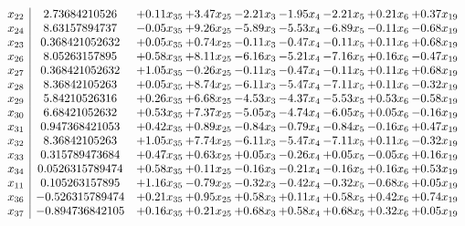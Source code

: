 \documentclass[8pt]{article}
\begin{document}
\[\begin{array}{c| c c@{\hskip 2pt} c@{\hskip 2pt} c@{\hskip 2pt} c@{\hskip 2pt} c@{\hskip 2pt} c@{\hskip 2pt} c@{\hskip 2pt} }
 x_{22}   &  2.73684210526 & +  0.11 x_{35} & +  3.47 x_{25} & -2.21 x_{3} & -1.95 x_{4} & -2.21 x_{5} & +  0.21 x_{6} & +  0.37 x_{19}\\
 x_{24}   &  8.63157894737 & -0.05 x_{35} & +  9.26 x_{25} & -5.89 x_{3} & -5.53 x_{4} & -6.89 x_{5} & -0.11 x_{6} & -0.68 x_{19}\\
 x_{23}   &  0.368421052632 & +  0.05 x_{35} & +  0.74 x_{25} & -0.11 x_{3} & -0.47 x_{4} & -0.11 x_{5} & +  0.11 x_{6} & +  0.68 x_{19}\\
 x_{26}   &  8.05263157895 & +  0.58 x_{35} & +  8.11 x_{25} & -6.16 x_{3} & -5.21 x_{4} & -7.16 x_{5} & +  0.16 x_{6} & -0.47 x_{19}\\
 x_{27}   &  0.368421052632 & +  1.05 x_{35} & -0.26 x_{25} & -0.11 x_{3} & -0.47 x_{4} & -0.11 x_{5} & +  0.11 x_{6} & +  0.68 x_{19}\\
 x_{28}   &  8.36842105263 & +  0.05 x_{35} & +  8.74 x_{25} & -6.11 x_{3} & -5.47 x_{4} & -7.11 x_{5} & +  0.11 x_{6} & -0.32 x_{19}\\
 x_{29}   &  5.84210526316 & +  0.26 x_{35} & +  6.68 x_{25} & -4.53 x_{3} & -4.37 x_{4} & -5.53 x_{5} & +  0.53 x_{6} & -0.58 x_{19}\\
 x_{30}   &  6.68421052632 & +  0.53 x_{35} & +  7.37 x_{25} & -5.05 x_{3} & -4.74 x_{4} & -6.05 x_{5} & +  0.05 x_{6} & -0.16 x_{19}\\
 x_{31}   &  0.947368421053 & +  0.42 x_{35} & +  0.89 x_{25} & -0.84 x_{3} & -0.79 x_{4} & -0.84 x_{5} & -0.16 x_{6} & +  0.47 x_{19}\\
 x_{32}   &  8.36842105263 & +  1.05 x_{35} & +  7.74 x_{25} & -6.11 x_{3} & -5.47 x_{4} & -7.11 x_{5} & +  0.11 x_{6} & -0.32 x_{19}\\
 x_{33}   &  0.315789473684 & +  0.47 x_{35} & +  0.63 x_{25} & +  0.05 x_{3} & -0.26 x_{4} & +  0.05 x_{5} & -0.05 x_{6} & +  0.16 x_{19}\\
 x_{34}   &  0.0526315789474 & +  0.58 x_{35} & +  0.11 x_{25} & -0.16 x_{3} & -0.21 x_{4} & -0.16 x_{5} & +  0.16 x_{6} & +  0.53 x_{19}\\
 x_{11}   &  0.105263157895 & +  1.16 x_{35} & -0.79 x_{25} & -0.32 x_{3} & -0.42 x_{4} & -0.32 x_{5} & -0.68 x_{6} & +  0.05 x_{19}\\
 x_{36}   &  -0.526315789474 & +  0.21 x_{35} & +  0.95 x_{25} & +  0.58 x_{3} & +  0.11 x_{4} & +  0.58 x_{5} & +  0.42 x_{6} & +  0.74 x_{19}\\
 x_{37}   &  -0.894736842105 & +  0.16 x_{35} & +  0.21 x_{25} & +  0.68 x_{3} & +  0.58 x_{4} & +  0.68 x_{5} & +  0.32 x_{6} & +  0.05 x_{19}\\

\end{array}\]
\end{document}
